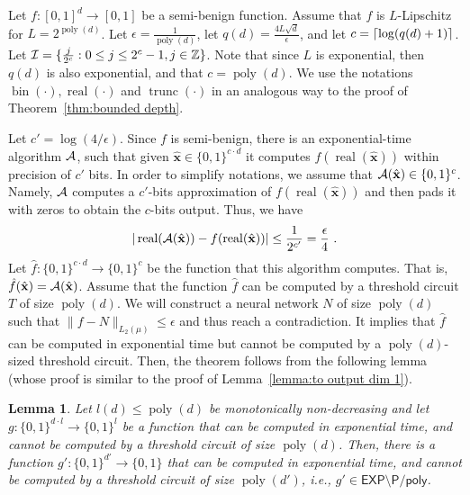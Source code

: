 \documentclass[11pt]{article}
\newtheorem{lemma}{Lemma}[section]
\DeclarePairedDelimiter\ceil{\lceil}{\rceil}
\newcommand{\bx}{\mathbf{x}}
\newcommand{\ca}{{\cal A}}
\newcommand{\ci}{{\cal I}}
\newcommand{\integers}{{\mathbb Z}}
\DeclareMathOperator{\poly}{poly}
\DeclareMathOperator{\bin}{bin}
\DeclareMathOperator{\real}{real}
\DeclareMathOperator{\trunc}{trunc}
\newcommand{\snorm}[1]{\|#1\|} %
\newcommand{\hbx}{{\hat{\bx}}}
\newcommand{\Ppoly}{\textsf{P/poly}}
\newcommand{\EXP}{\textsf{EXP}}
\begin{document}
Let $f:[0,1]^d \rightarrow [0,1]$ be a semi-benign function. Assume that $f$ is $L$-Lipschitz for $L=2^{\poly(d)}$. Let $\epsilon=\frac{1}{\poly(d)}$, let 
$q(d)=\frac{4L\sqrt{d}}{\epsilon}$, 
and let $c=\ceil{\log(q(d)+1)}$. Let $\ci = \{\frac{j}{2^c}: 0 \leq j \leq  2^c - 1, j \in \integers\}$. 
Note that since $L$ is exponential, then $q(d)$ is also exponential, and that $c=\poly(d)$.
We use the notations $\bin(\cdot),\real(\cdot)$ and $\trunc(\cdot)$ in an analogous way to the proof of Theorem~\ref{thm:bounded depth}.

Let $c' = \log(4/\epsilon)$. Since $f$ is semi-benign, there is an exponential-time algorithm $\ca$, such that given $\hbx \in \{0,1\}^{c \cdot d}$ it computes $f(\real(\hbx))$ within precision of $c'$ bits. In order to simplify notations, we assume that $\ca(\hbx) \in \{0,1\}^c$. Namely, $\ca$ computes a $c'$-bits approximation of $f(\real(\hbx))$ and then pads it with zeros to obtain the $c$-bits output. Thus, we have
\begin{equation}
	\label{eq:def hatf - size}
	|\real(\ca(\hbx)) - f(\real(\hbx))| \leq \frac{1}{2^{c'}} = \frac{\epsilon}{4}~.
\end{equation}
Let $\hat{f}:\{0,1\}^{c \cdot d} \rightarrow \{0,1\}^c$ be the function that this algorithm computes. That is, $\hat{f}(\hbx)=\ca(\hbx)$.
Assume 
that the function $\hat{f}$ can be computed by a threshold circuit $T$ of size $\poly(d)$. We will construct a neural network $N$ of size $\poly(d)$ such that $\snorm{f-N}_{L_2(\mu)} \leq \epsilon$ and thus reach a contradiction. It implies that $\hat{f}$ can be computed in exponential time but cannot be computed by a $\poly(d)$-sized threshold circuit.
Then, the theorem follows from the following lemma (whose proof is similar to the proof of Lemma~\ref{lemma:to output dim 1}).
\begin{lemma}
	\label{lemma:to output dim 1 - size}
	Let $l(d) \leq \poly(d)$ be monotonically non-decreasing and let $g:\{0,1\}^{d \cdot l} \rightarrow \{0,1\}^l$ be a function that can be computed in exponential time, and cannot be computed by a threshold circuit of size $\poly(d)$. Then, there is a function $g':\{0,1\}^{d'} \rightarrow \{0,1\}$ that can be computed in exponential time, and cannot be computed by a threshold circuit of size $\poly(d')$, i.e., $g' \in \EXP \setminus \Ppoly$.
\end{lemma}
\end{document}

